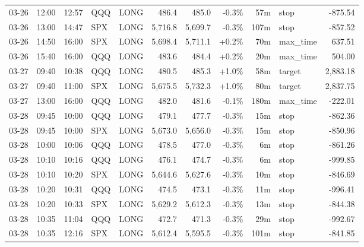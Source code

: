 \documentclass[11pt,a4paper,twoside]{article}
\begin{document}
\begin{center}
\begin{longtable}{>{\color{txtmain}}l l l l l r r r r >{\color{txtmain}}l r}
03-26 & 12:00 & 12:57 & QQQ & LONG & 486.4 & 485.0 & \textcolor{lossred}{-0.3\%} & 57m & stop & \textcolor{lossred}{-875.54} \\
03-26 & 13:00 & 14:47 & SPX & LONG & 5,716.8 & 5,699.7 & \textcolor{lossred}{-0.3\%} & 107m & stop & \textcolor{lossred}{-857.52} \\
03-26 & 14:50 & 16:00 & SPX & LONG & 5,698.4 & 5,711.1 & \textcolor{wingreen}{+0.2\%} & 70m & max\_time & \textcolor{wingreen}{637.51} \\
03-26 & 15:40 & 16:00 & QQQ & LONG & 483.6 & 484.4 & \textcolor{wingreen}{+0.2\%} & 20m & max\_time & \textcolor{wingreen}{504.00} \\
03-27 & 09:40 & 10:38 & QQQ & LONG & 480.5 & 485.3 & \textcolor{wingreen}{+1.0\%} & 58m & target & \textcolor{wingreen}{2,883.18} \\
03-27 & 09:40 & 11:00 & SPX & LONG & 5,675.5 & 5,732.3 & \textcolor{wingreen}{+1.0\%} & 80m & target & \textcolor{wingreen}{2,837.75} \\
03-27 & 13:00 & 16:00 & QQQ & LONG & 482.0 & 481.6 & \textcolor{lossred}{-0.1\%} & 180m & max\_time & \textcolor{lossred}{-222.01} \\
03-28 & 09:45 & 10:00 & QQQ & LONG & 479.1 & 477.7 & \textcolor{lossred}{-0.3\%} & 15m & stop & \textcolor{lossred}{-862.36} \\
03-28 & 09:45 & 10:00 & SPX & LONG & 5,673.0 & 5,656.0 & \textcolor{lossred}{-0.3\%} & 15m & stop & \textcolor{lossred}{-850.96} \\
03-28 & 10:00 & 10:06 & QQQ & LONG & 478.5 & 477.0 & \textcolor{lossred}{-0.3\%} & 6m & stop & \textcolor{lossred}{-861.26} \\
03-28 & 10:10 & 10:16 & QQQ & LONG & 476.1 & 474.7 & \textcolor{lossred}{-0.3\%} & 6m & stop & \textcolor{lossred}{-999.85} \\
03-28 & 10:10 & 10:20 & SPX & LONG & 5,644.6 & 5,627.6 & \textcolor{lossred}{-0.3\%} & 10m & stop & \textcolor{lossred}{-846.69} \\
03-28 & 10:20 & 10:31 & QQQ & LONG & 474.5 & 473.1 & \textcolor{lossred}{-0.3\%} & 11m & stop & \textcolor{lossred}{-996.41} \\
03-28 & 10:20 & 10:33 & SPX & LONG & 5,629.2 & 5,612.3 & \textcolor{lossred}{-0.3\%} & 13m & stop & \textcolor{lossred}{-844.38} \\
03-28 & 10:35 & 11:04 & QQQ & LONG & 472.7 & 471.3 & \textcolor{lossred}{-0.3\%} & 29m & stop & \textcolor{lossred}{-992.67} \\
03-28 & 10:35 & 12:16 & SPX & LONG & 5,612.4 & 5,595.5 & \textcolor{lossred}{-0.3\%} & 101m & stop & \textcolor{lossred}{-841.85} \\

\end{longtable}
\end{center}
\end{document}

